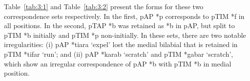 Table~\ref{tab:3:1} and Table~\ref{tab:3:2} present the forms for these two correspondence sets respectively. In the first, pAP *p corresponds to pTIM *f in all positions. In the second, pTAP *b was retained as *b in pAP, but split to pTIM *b initially and pTIM *p non-initially. In these sets, there are two notable irregularities: 
(i) pAP *tiara `expel' lost the medial bilabial that is retained in pTIM *tifar `run'; and 
(ii) pAP *karab `scratch' and pTIM *gabar `scratch', which show an irregular correspondence of pAP *b with pTIM *b in medial position. 
 


